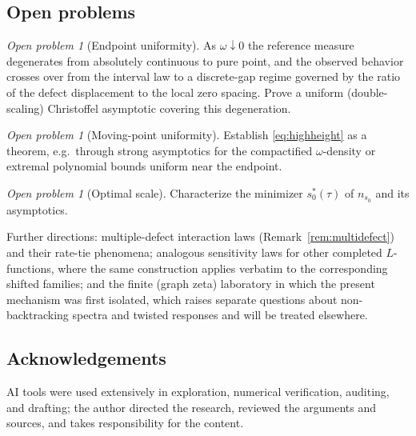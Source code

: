 \documentclass[11pt]{amsart}
\theoremstyle{definition}
\theoremstyle{remark}
\newtheorem{openproblem}[theorem]{Open problem}
\begin{document}
\subsection{Open problems}
\begin{openproblem}[Endpoint uniformity]
As $\omega\downarrow0$ the reference measure degenerates from absolutely
continuous to pure point, and the observed behavior crosses over from the
interval law to a discrete-gap regime governed by the ratio of the defect
displacement to the local zero spacing. Prove a uniform (double-scaling)
Christoffel asymptotic covering this degeneration.
\end{openproblem}
\begin{openproblem}[Moving-point uniformity]
Establish \eqref{eq:highheight} as a theorem, e.g.\ through strong
asymptotics for the compactified $\omega$-density or extremal polynomial
bounds uniform near the endpoint.
\end{openproblem}
\begin{openproblem}[Optimal scale]
Characterize the minimizer $s_0^*(\tau)$ of $n_{s_0}$ and its asymptotics.
\end{openproblem}
Further directions: multiple-defect interaction laws
(Remark~\ref{rem:multidefect}) and their rate-tie phenomena; analogous
sensitivity laws for other completed $L$-functions, where the same
construction applies verbatim to the corresponding shifted families; and the
finite (graph zeta) laboratory in which the present mechanism was first
isolated, which raises separate questions about non-backtracking spectra and
twisted responses and will be treated elsewhere.

\subsection*{Acknowledgements}
AI tools were used extensively in exploration, numerical verification,
auditing, and drafting; the author directed the research, reviewed the
arguments and sources, and takes responsibility for the content.
\end{document}
